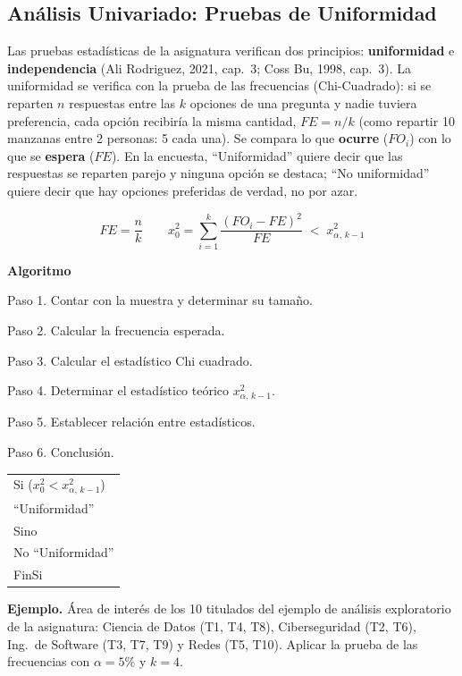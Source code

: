\documentclass[12pt, a4paper]{article}
\begin{document}
\subsection{Análisis Univariado: Pruebas de Uniformidad}\label{sec:resultado-uniformidad}

Las pruebas estadísticas de la asignatura verifican dos principios:
\textbf{uniformidad} e \textbf{independencia} (Ali Rodriguez, 2021, cap.~3;
Coss Bu, 1998, cap.~3). La uniformidad se verifica con la prueba de las
frecuencias (Chi-Cuadrado): si se reparten $n$ respuestas entre las $k$
opciones de una pregunta y nadie tuviera preferencia, cada opción
recibiría la misma cantidad, $FE = n/k$ (como repartir 10 manzanas entre
2 personas: 5 cada una). Se compara lo que \textbf{ocurre} ($FO_i$) con
lo que se \textbf{espera} ($FE$). En la encuesta, ``Uniformidad'' quiere
decir que las respuestas se reparten parejo y ninguna opción se destaca;
``No uniformidad'' quiere decir que hay opciones preferidas de verdad, no
por azar.

\[
\boxed{\;FE = \frac{n}{k} \qquad x_0^2 = \sum_{i=1}^{k} \frac{(FO_i - FE)^2}{FE} \;<\; x^2_{\alpha,\,k-1}\;}
\]

\textbf{Algoritmo}

Paso 1. Contar con la muestra y determinar su tamaño.

Paso 2. Calcular la frecuencia esperada.

Paso 3. Calcular el estadístico Chi cuadrado.

Paso 4. Determinar el estadístico teórico $x^2_{\alpha,\,k-1}$.

Paso 5. Establecer relación entre estadísticos.

Paso 6. Conclusión.

\begin{center}
\begin{tabular}{l}
Si ($x_0^2 < x^2_{\alpha,\,k-1}$)\\
\quad ``Uniformidad''\\
Sino\\
\quad No ``Uniformidad''\\
FinSi
\end{tabular}
\end{center}

\textbf{Ejemplo.} Área de interés de los 10 titulados del ejemplo de
análisis exploratorio de la asignatura: Ciencia de Datos (T1, T4, T8),
Ciberseguridad (T2, T6), Ing.\ de Software (T3, T7, T9) y Redes (T5,
T10). Aplicar la prueba de las frecuencias con $\alpha = 5\%$ y $k = 4$.
\end{document}

